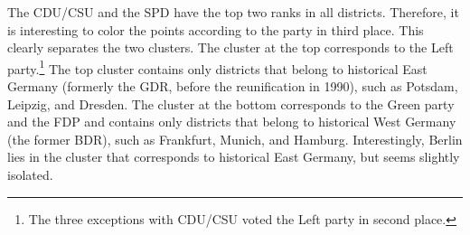 The CDU/CSU and the SPD have the top two ranks in all districts.
Therefore, it is interesting to color the points according to the party in third place.
This clearly separates the two clusters.
The cluster at the top corresponds to the Left party.\footnote{The three exceptions with CDU/CSU voted the Left party in second place.}
The top cluster contains only districts that belong to historical East Germany (formerly the GDR, before the reunification in 1990), such as Potsdam, Leipzig, and Dresden.
The cluster at the bottom corresponds to the Green party and the FDP and contains only districts that belong to historical West Germany (the former BDR), such as Frankfurt, Munich, and Hamburg.
Interestingly, Berlin lies in the cluster that corresponds to historical East Germany, but seems slightly isolated.
